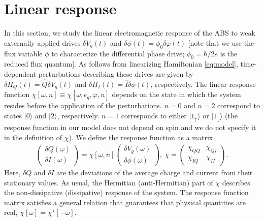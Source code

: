 \documentclass[aps,reprint,longbibliography, prb]{revtex4-2}
\begin{document}
\section{Linear response}
\label{sec:lin-res}
In this section, we study the linear electromagnetic response of the ABS to weak externally applied drives $\delta V_g(t)$ and $\delta\phi(t) = \phi_0\delta\varphi(t)$ [note that we use the flux variable $\phi$ to characterize the differential phase drive; $\phi_0 = \hbar/2e$ is the reduced flux quantum]. As follows from linearizing Hamiltonian \eqref{eq:model}, time-dependent perturbations describing these drives are given by $\delta H_{Q}(t) = \hat{Q} \delta V_g(t)$ and $\delta H_I (t)=  \hat{I}\delta\phi(t)$, respectively.
The linear response function $\chi[\omega, n] \equiv \chi[\omega, \epsilon_g, \varphi, n]$ depends on the state in which the system resides before the application of the perturbations. $n=0$ and $n=2$ correspond to states $|0\rangle$ and $|2\rangle$, respectively. $n=1$ corresponds to either $|1_\uparrow\rangle$ or $|1_\downarrow\rangle$ (the response function in our model does not depend on spin and we do not specify it in the definition of $\chi$). We define the response function as a matrix
\begin{gather}
    \begin{pmatrix}
    \delta Q(\omega)\\
    \delta I(\omega)
    \end{pmatrix}
    =
    \chi[\omega,n]
    \begin{pmatrix}
    \delta V_g(\omega)\\
    \delta\phi(\omega)
    \end{pmatrix},\:
    \chi =  \begin{pmatrix}
    \chi_{QQ}&\chi_{QI}\\
    \chi_{IQ}&\chi_{II}
    \end{pmatrix}.
\end{gather}
Here, $\delta Q$ and $\delta I$ are the deviations of the average charge and current from their stationary values. As usual, the Hermitian (anti-Hermitian) part of $\chi$ describes the non-dissipative (dissipative) response of the system. The response function matrix satisfies a general relation that guarantees that physical quantities are real, $\chi[\omega]=\chi^\star[-\omega]$.
\end{document}
